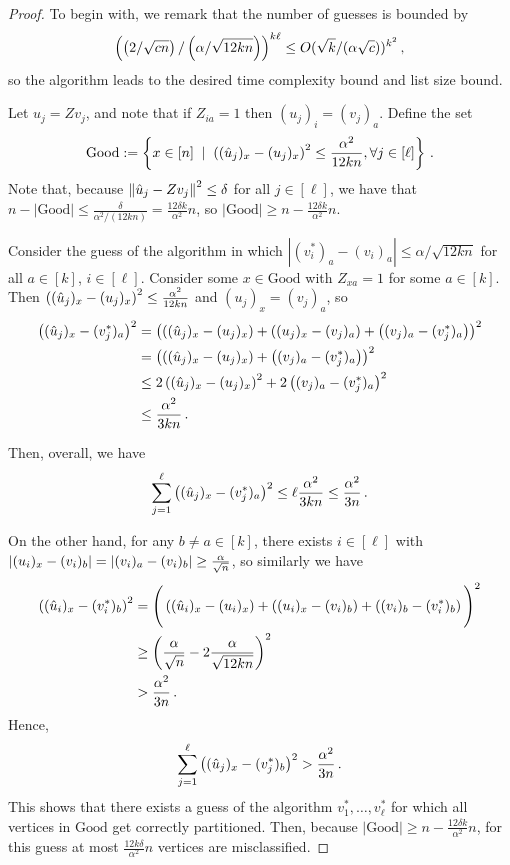 \begin{proof}
    To begin with, we remark that the number of guesses is bounded by
    \[\left(\left(2/\sqrt{cn}\right) / \left(\alpha/\sqrt{12kn}\right)\right)^{k\ell} \leq O(\sqrt{k}/(\alpha\sqrt{c}))^{k^2}\,,\] 
    so the algorithm leads to the desired time complexity bound and list size bound.

    Let $u_j=Zv_j$, and note that if $Z_{ia}=1$ then $(u_j)_i=(v_j)_a$. Define the set 
    $$\mathrm{Good}:=\left\{x\in [n]\;\mid\; \left((\hat{u}_j)_x-(u_j)_x\right)^2\leq \frac{\alpha^2}{12kn}, \forall j \in [\ell]\right\}\,.$$
    Note that, because $\left\lVert\hat{u}_j-Zv_j\right\rVert^2\leq \delta$ for all $j \in [\ell]$, we have that $n - |\mathrm{Good}| \leq \frac{\delta}{\alpha^2/(12kn)} = \frac{12\delta k}{\alpha^2} n$, so $|\mathrm{Good}| \geq n - \frac{12\delta k}{\alpha^2} n$.

    Consider the guess of the algorithm in which $|(v^*_i)_a - (v_i)_a| \leq \alpha / \sqrt{12 k n}$ for all $a \in [k]$, $i \in [\ell]$.
    Consider some $x \in \mathrm{Good}$ with $Z_{x a}=1$ for some $a \in [k]$.
    Then $\left((\hat{u}_j)_x-(u_j)_x\right)^2\leq \frac{\alpha^2}{12kn}$ and $(u_j)_x = (v_j)_a$, so
    \begin{align*}
        \left((\hat{u}_j)_x-(v^*_j)_a\right)^2
        &= \left(\left((\hat{u}_j)_x-(u_j)_x\right)+\left((u_j)_x-(v_j)_a\right)+\left((v_j)_a-(v^*_j)_a\right)\right)^2\\
        &= \left(\left((\hat{u}_j)_x-(u_j)_x\right)+\left((v_j)_a-(v^*_j)_a\right)\right)^2\\
        &\leq 2 \left((\hat{u}_j)_x-(u_j)_x\right)^2 + 2 \left((v_j)_a-(v^*_j)_a\right)^2\\
        &\leq \frac{\alpha^2}{3kn}\,.
    \end{align*}

    Then, overall, we have 
    $$\sum_{j=1}^\ell \left((\hat{u}_j)_x-(v^*_j)_a\right)^2 \leq \ell \frac{\alpha^2}{3kn} \leq \frac{\alpha^2}{3n}\,.$$

    On the other hand, for any $b \neq a \in [k]$, there exists $i\in[\ell]$ with $\left\lvert(u_i)_x-(v_i)_b\right\rvert=\left\lvert(v_i)_a-(v_i)_b\right\rvert\geq \frac{\alpha}{\sqrt{n}}$, so similarly we have
    \begin{align*}
    \left((\hat{u}_i)_x-(v_i^*)_b\right)^2
    &= \Bigg(\left((\hat{u}_i)_x-(u_i)_x\right)+\left((u_i)_x-(v_i)_b\right)+\left((v_i)_b-(v^*_i)_b\right)\Bigg)^2\\
    &\geq \left(\frac{\alpha}{\sqrt{n}}-2\frac{\alpha}{\sqrt{12kn}}\right)^2\\
    &> \frac{\alpha^2}{3n}\,.
    \end{align*}
    Hence, 
    $$\sum_{j=1}^\ell \left((\hat{u}_j)_x-(v_j^*)_b\right)^2 > \frac{\alpha^2}{3n}\,.$$
    This shows that there exists a guess of the algorithm $v_1^*, \ldots, v_\ell^*$ for which all vertices in $\mathrm{Good}$ get correctly partitioned.
    Then, because $|\mathrm{Good}| \geq n - \frac{12\delta k}{\alpha^2} n$, for this guess at most $\frac{12k\delta}{\alpha^2}n$ vertices are misclassified.
\end{proof}

